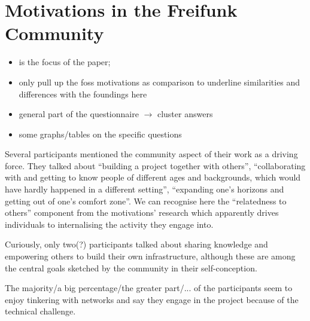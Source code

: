 \section{Motivations in the Freifunk Community}

\begin{itemize}
  \item is the focus of the paper;
  \item only pull up the foss motivations as comparison to underline similarities and differences with the foundings here
  \item general part of the questionnaire $\rightarrow$ cluster answers
  \item some graphs/tables on the specific questions
\end{itemize}



Several participants mentioned the community aspect of their work as a driving force.
They talked about ``building a project together with others'', ``collaborating with and getting to know people of different ages and backgrounds, which would have hardly happened in a different setting'', ``expanding one's horizons and getting out of one's comfort zone''.
We can recognise here the ``relatedness to others'' component from the motivations' research which apparently drives individuals to internalising the activity they engage into.

Curiously, only two(?) participants talked about sharing knowledge and empowering others to build their own infrastructure, although these are among the central goals sketched by the community in their self-conception\cite{ffweb}.



The majority/a big percentage/the greater part/... of the participants seem to enjoy tinkering with networks and say they engage in the project because of the technical challenge.

